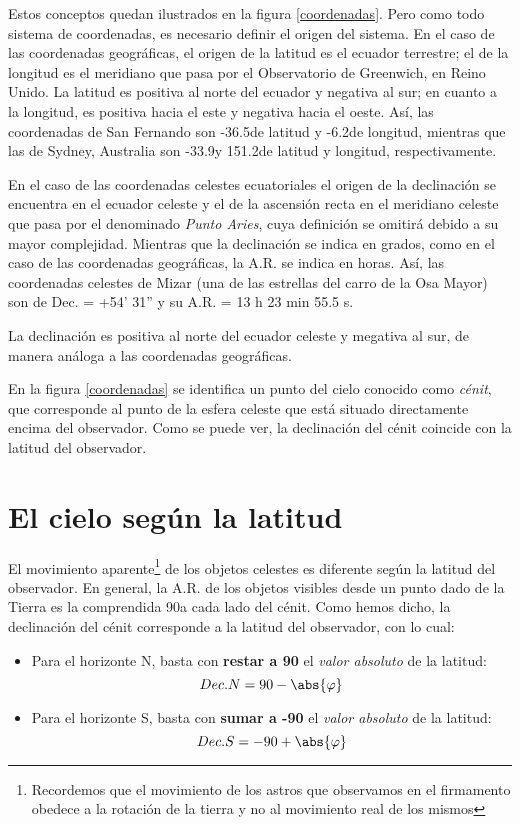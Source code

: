 \documentclass[10pt,a5paper,twoside]{amsbook}
\begin{document}
Estos conceptos quedan ilustrados en la figura \ref{coordenadas}. Pero como todo sistema de coordenadas, es necesario definir el origen del sistema. En el caso de las coordenadas geográficas, el origen de la latitud es el ecuador terrestre; el de la longitud es el meridiano que pasa por el Observatorio de Greenwich, en Reino Unido. La latitud es positiva al norte del ecuador y negativa al sur; en cuanto a la longitud, es positiva hacia el este y negativa hacia el oeste. Así, las coordenadas de San Fernando son -36.5\textdegree de latitud y -6.2\textdegree de longitud, mientras que las de Sydney, Australia son -33.9\textdegree y 151.2\textdegree de latitud y longitud, respectivamente.

En el caso de las coordenadas celestes ecuatoriales el origen de la declinación se encuentra en el ecuador celeste y el de la ascensión recta en el meridiano celeste que pasa por el denominado \textit{Punto Aries}, cuya definición se omitirá debido a su mayor complejidad. Mientras que la declinación se indica en grados, como en el caso de las coordenadas geográficas, la A.R. se indica en horas. Así, las coordenadas celestes de Mizar (una de las estrellas del carro de la Osa Mayor) son de Dec. = +54' 31'' y su A.R. = 13 h 23 min 55.5 s. 

La declinación es positiva al norte del ecuador celeste y megativa al sur, de manera análoga a las coordenadas geográficas.

En la figura \ref{coordenadas} se identifica un punto del cielo conocido como \textit{cénit}, que corresponde al punto de la esfera celeste que está situado directamente encima del observador. Como se puede ver, la declinación del cénit coincide con la latitud del observador.

\section{El cielo según la latitud}

El movimiento aparente\footnote{Recordemos que el movimiento de los astros que observamos en el firmamento obedece a la rotación de la tierra y no al movimiento real de los mismos} de los objetos celestes es diferente según la latitud del observador. En general, la A.R. de los objetos visibles desde un punto dado de la Tierra es la comprendida 90\textdegree a cada lado del cénit. Como hemos dicho, la declinación del cénit corresponde a la latitud del observador, con lo cual:

\begin{itemize}
 \item Para el horizonte N, basta con \textbf{restar a 90\textdegree} el \textit{valor absoluto} de la latitud: 
 \[Dec. N = 90 - \abs{\varphi}\]
 \item Para el horizonte S, basta con \textbf{sumar a -90\textdegree} el \textit{valor absoluto} de la latitud:
 \[Dec. S = -90 + \abs{\varphi}\]
\end{itemize}
\end{document}
